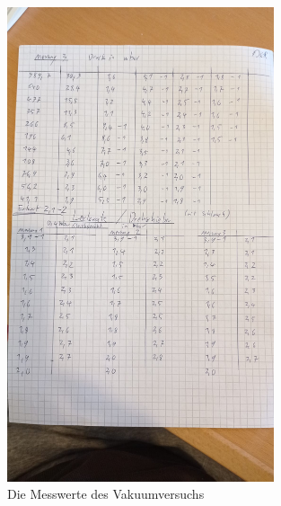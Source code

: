 \begin{figure}[h]
    \centering
    \includegraphics[width=0.7\textwidth]{latex/images/Messwerte_2.jpeg}
    \caption{Die Messwerte des Vakuumversuchs}
\end{figure}

